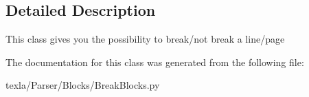 \subsection{Detailed Description}
\begin{DoxyVerb}This class gives you the possibility to
    break/not break a line/page\end{DoxyVerb}
 

The documentation for this class was generated from the following file\+:\begin{DoxyCompactItemize}
\item 
texla/\+Parser/\+Blocks/Break\+Blocks.\+py\end{DoxyCompactItemize}
